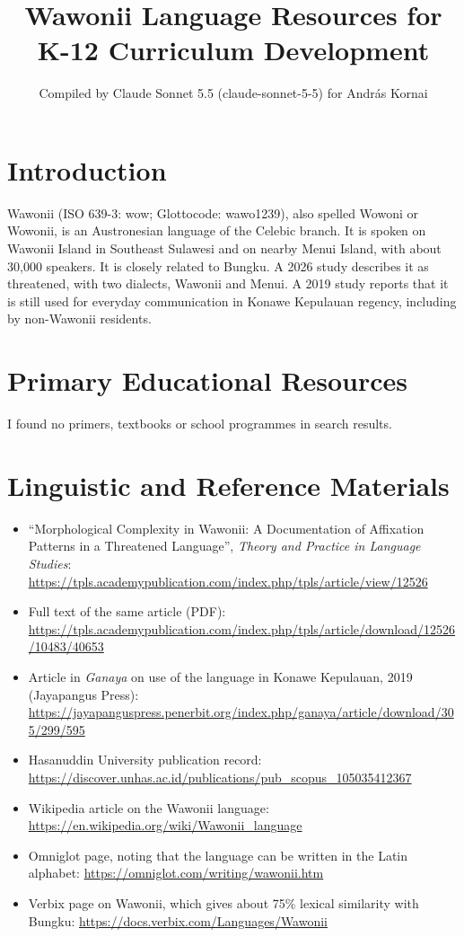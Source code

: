 \documentclass[12pt]{article}
\title{Wawonii Language Resources for K-12 Curriculum Development}
\author{Compiled by Claude Sonnet 5.5 (claude-sonnet-5-5) for Andr\'as Kornai}
\date{}
\begin{document}
\maketitle

\section{Introduction}
Wawonii (ISO 639-3: wow; Glottocode: wawo1239), also spelled Wowoni or Wowonii, is an Austronesian language of the Celebic branch. It is spoken on Wawonii Island in Southeast Sulawesi and on nearby Menui Island, with about 30,000 speakers. It is closely related to Bungku. A 2026 study describes it as threatened, with two dialects, Wawonii and Menui. A 2019 study reports that it is still used for everyday communication in Konawe Kepulauan regency, including by non-Wawonii residents.

\section{Primary Educational Resources}
I found no primers, textbooks or school programmes in search results.

\section{Linguistic and Reference Materials}
\begin{itemize}
\item ``Morphological Complexity in Wawonii: A Documentation of Affixation Patterns in a Threatened Language'', \emph{Theory and Practice in Language Studies}: \url{https://tpls.academypublication.com/index.php/tpls/article/view/12526}
\item Full text of the same article (PDF): \url{https://tpls.academypublication.com/index.php/tpls/article/download/12526/10483/40653}
\item Article in \emph{Ganaya} on use of the language in Konawe Kepulauan, 2019 (Jayapangus Press): \url{https://jayapanguspress.penerbit.org/index.php/ganaya/article/download/305/299/595}
\item Hasanuddin University publication record: \url{https://discover.unhas.ac.id/publications/pub_scopus_105035412367}
\item Wikipedia article on the Wawonii language: \url{https://en.wikipedia.org/wiki/Wawonii_language}
\item Omniglot page, noting that the language can be written in the Latin alphabet: \url{https://omniglot.com/writing/wawonii.htm}
\item Verbix page on Wawonii, which gives about 75\% lexical similarity with Bungku: \url{https://docs.verbix.com/Languages/Wawonii}
\end{itemize}
\end{document}
